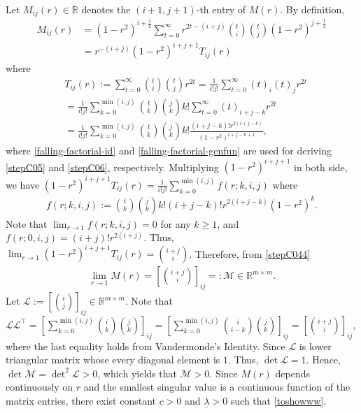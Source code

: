 \documentclass[preprint,5p,times,twocolumn]{elsarticle}
\begin{document}
Let $M_{ij}(r) \in \mathbb R$ denotes the $(i+1,j+1)$-th entry of $M(r)$. By definition, 
\begin{align}
        M_{ij}(r) &= (1-r^2)^{i+\frac{1}{2}}\sum_{t=0}^{\infty}r^{2t-(i+j)}\binom{t}{i}\binom{t}{j}(1-r^2)^{j+\frac{1}{2}} \nonumber \\
        & =  r^{-(i+j)}(1-r^2)^{i+j+1}T_{ij}(r) \label{stepC044}
\end{align}
where 
\begin{align}
&T_{ij}(r) := \sum_{t=0}^{\infty}\binom{t}{i}\binom{t}{j} r^{2t} = \frac{1}{i!j!}\sum_{t=0}^{\infty} (t)_i(t)_jr^{2t} \nonumber \\
&= \frac{1}{i!j!}\sum_{k=0}^{\min(i,j)}\binom{t}{k}\binom{j}{k}k!\sum_{t=0}^{\infty} (t)_{i+j-k} r^{2t} \label{stepC05} \\
&= \frac{1}{i!j!}\sum_{k=0}^{\min(i,j)}\binom{t}{k}\binom{j}{k}k! \frac{(i+j-k)! r^{2(i+j-k)}}{(1-r^2)^{i+j-k+1}}, \label{stepC06}
\end{align} 
where \eqref{falling-factorial-id} and \eqref{falling-factorial-genfun} are used for deriving \eqref{stepC05} and \eqref{stepC06}, respectively. Multiplying $(1-r^2)^{i+j+1}$ in both side, we have $(1-r^2)^{i+j+1}T_{ij}(r) = \frac{1}{i!j!}\sum_{k=0}^{\min(i,j)}f(r; k, i,j)$ where 
\begin{align}
    f(r; k, i,j) := \binom{t}{k}\binom{j}{k}k!(i+j-k)! r^{2(i+j-k)}(1-r^2)^k. 
\end{align}
Note that $\lim_{r \to 1}f(r; k,i,j) = 0$ for any $k \geq 1$, and $f(r; 0,i,j) = (i+j)! r^{2(i+j)}$. Thus, $\lim_{r \to 1}(1-r^2)^{i+j+1}T_{ij}(r) = \binom{i+j}{i}$. Therefore, from \eqref{stepC044}
\begin{align}
\lim_{r \to 1}M(r) = \left[\binom{i+j}{i}\right]_{ij} =: \mathcal M \in \mathbb R^{m \times m}. 
\end{align}
Let $\mathcal L:= \left[\binom{i}{j}\right]_{ij} \in \mathbb R^{m \times m}$. Note that $\mathcal L \mathcal L^{\top} = \left[\sum_{k=0}^{\min(i,j)} \binom{i}{k}\binom{j}{k}\right]_{ij} = \left[\sum_{k=0}^{\min(i,j)} \binom{i}{i-k}\binom{j}{k}\right]_{ij} = \left[\binom{i+j}{i}\right]_{ij}$, where the last equality holds from Vandermonde's Identity. Since $\mathcal L$ is lower triangular matrix whose every diagonal element is $1$. Thus, \(\det\mathcal L=1\). Hence, $\det \mathcal M=\det^2 \mathcal L > 0$, which yields that $\mathcal M > 0$. Since $M(r)$ depends continuously on $r$ and the smallest singular value is a continuous function of the matrix entries, there exist constant $c>0$ and $\underline{\lambda}>0$ such that \eqref{toshowww}. 
\end{document}
